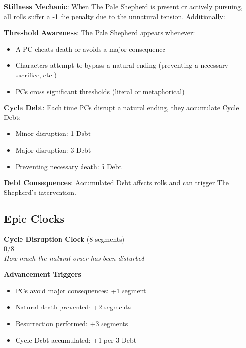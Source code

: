 \documentclass[11pt]{article}
\newcommand{\clocksegment}{\textbullet}
\begin{document}
\begin{mdframed}[backgroundcolor=mechanicbg]
\textbf{Stillness Mechanic}: When The Pale Shepherd is present or actively pursuing, all rolls suffer a -1 die penalty due to the unnatural tension. Additionally:

\textbf{Threshold Awareness}: The Pale Shepherd appears whenever:
\begin{itemize}[leftmargin=*]
\item A PC cheats death or avoids a major consequence
\item Characters attempt to bypass a natural ending (preventing a necessary sacrifice, etc.)
\item PCs cross significant thresholds (literal or metaphorical)
\end{itemize}

\textbf{Cycle Debt}: Each time PCs disrupt a natural ending, they accumulate Cycle Debt:
\begin{itemize}[leftmargin=*]
\item Minor disruption: 1 Debt
\item Major disruption: 3 Debt  
\item Preventing necessary death: 5 Debt
\end{itemize}

\textbf{Debt Consequences}: Accumulated Debt affects rolls and can trigger The Shepherd's intervention.
\end{mdframed}

\subsection*{Epic Clocks}

\begin{center}
\textbf{Cycle Disruption Clock} (8 segments)\\
\fbox{\clocksegment\clocksegment\clocksegment\clocksegment\clocksegment\clocksegment\clocksegment\clocksegment} 0/8\\
\textit{How much the natural order has been disturbed}
\end{center}

\textbf{Advancement Triggers}:
\begin{itemize}[leftmargin=*]
\item PCs avoid major consequences: +1 segment
\item Natural death prevented: +2 segments
\item Resurrection performed: +3 segments
\item Cycle Debt accumulated: +1 per 3 Debt
\end{itemize}
\end{document}
